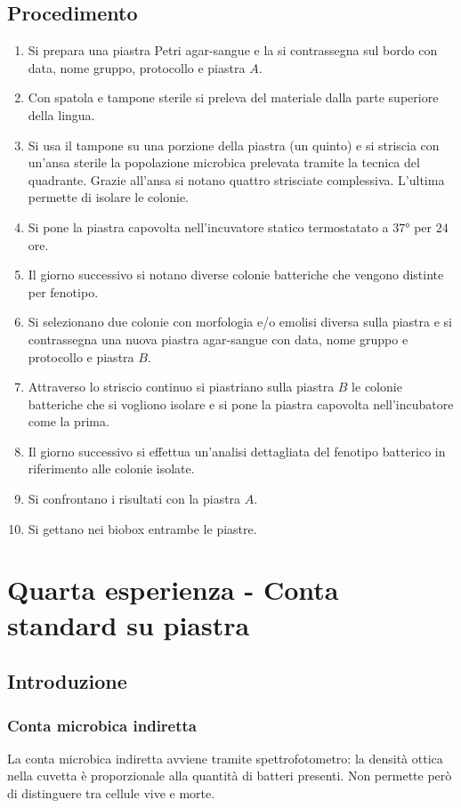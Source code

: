		\subsection{Procedimento}
		\begin{enumerate}
			\item Si prepara una piastra Petri agar-sangue e la si contrassegna sul bordo con data, nome gruppo, protocollo e piastra $A$.
			\item Con spatola e tampone sterile si preleva del materiale dalla parte superiore della lingua.
			\item Si usa il tampone su una porzione della piastra (un quinto) e si striscia con un'ansa sterile la popolazione microbica prelevata tramite la tecnica del quadrante.
				Grazie all'ansa si notano quattro strisciate complessiva.
				L'ultima permette di isolare le colonie.
			\item Si pone la piastra capovolta nell'incuvatore statico termostatato a $37\si{\degree}$ per $24$ ore.
			\item Il giorno successivo si notano diverse colonie batteriche che vengono distinte per fenotipo.
			\item Si selezionano due colonie con morfologia e/o emolisi diversa sulla piastra e si contrassegna una nuova piastra agar-sangue con data, nome gruppo e protocollo e piastra $B$.
			\item Attraverso lo striscio continuo si piastriano sulla piastra $B$ le colonie batteriche che si vogliono isolare e si pone la piastra capovolta nell'incubatore come la prima.
			\item Il giorno successivo si effettua un'analisi dettagliata del fenotipo batterico in riferimento alle colonie isolate.
			\item Si confrontano i risultati con la piastra $A$.
			\item Si gettano nei biobox entrambe le piastre.
		\end{enumerate}
\section{Quarta esperienza - Conta standard su piastra}

	\subsection{Introduzione}

		\subsubsection{Conta microbica indiretta}
		La conta microbica indiretta avviene tramite spettrofotometro: la densit\`a ottica nella cuvetta \`e proporzionale alla quantit\`a di batteri presenti.
		Non permette per\`o di distinguere tra cellule vive e morte.


